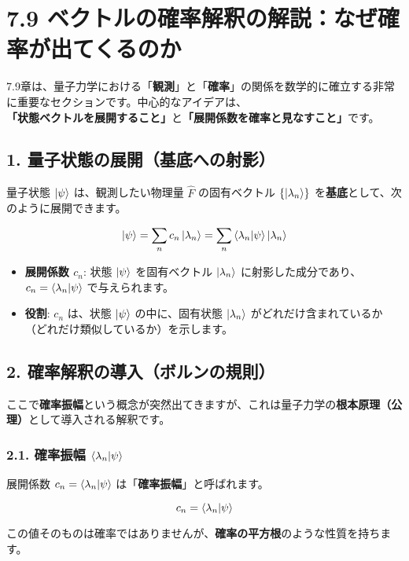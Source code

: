 \documentclass{ltjsarticle}
\begin{document}
\section*{7.9 ベクトルの確率解釈の解説：なぜ確率が出てくるのか}

7.9章は、量子力学における「\textbf{観測}」と「\textbf{確率}」の関係を数学的に確立する非常に重要なセクションです。中心的なアイデアは、\textbf{「状態ベクトルを展開すること」}と\textbf{「展開係数を確率と見なすこと」}です。

\subsection*{1. 量子状態の展開（基底への射影）}

量子状態 $\ket{\psi}$ は、観測したい物理量 $\hat{F}$ の固有ベクトル $\{ \ket{\lambda_n} \}$ を\textbf{基底}として、次のように展開できます。

\[
\ket{\psi} = \sum_{n} c_n \ket{\lambda_n} = \sum_{n} \braket{\lambda_n|\psi} \ket{\lambda_n}
\]

\begin{itemize}
    \item \textbf{展開係数 $c_n$}: 状態 $\ket{\psi}$ を固有ベクトル $\ket{\lambda_n}$ に射影した成分であり、$c_n = \braket{\lambda_n|\psi}$ で与えられます。
    \item \textbf{役割}: $c_n$ は、状態 $\ket{\psi}$ の中に、固有状態 $\ket{\lambda_n}$ がどれだけ含まれているか（どれだけ類似しているか）を示します。
\end{itemize}

\subsection*{2. 確率解釈の導入（ボルンの規則）}

ここで\textbf{確率振幅}という概念が突然出てきますが、これは量子力学の\textbf{根本原理（公理）}として導入される解釈です。

\subsubsection*{2.1. 確率振幅 $\braket{\lambda_n|\psi}$}

展開係数 $c_n = \braket{\lambda_n|\psi}$ は「\textbf{確率振幅}」と呼ばれます。

\[
c_n = \braket{\lambda_n|\psi}
\]

この値そのものは確率ではありませんが、\textbf{確率の平方根}のような性質を持ちます。
\end{document}
